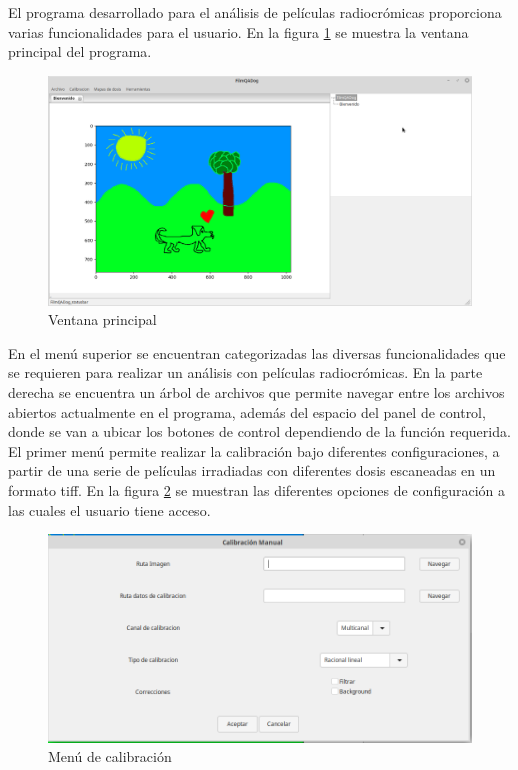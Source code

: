 El programa desarrollado para el análisis de películas radiocrómicas proporciona varias funcionalidades para el usuario. En la figura \ref{fig:ventanaPrincipal} se muestra la ventana principal del programa.\\
\begin{figure}[H]
	\centering
	\includegraphics[width=0.7\linewidth]{images/imagenesDocumentacion/ventanaPrincipal.png}
	\caption{Ventana principal }
	\label{fig:ventanaPrincipal}
\end{figure}

En el menú superior se encuentran categorizadas las diversas funcionalidades que se requieren para realizar un análisis con películas radiocrómicas. En la parte derecha se encuentra un árbol de archivos que permite navegar entre los archivos abiertos actualmente en el programa, además del espacio del panel de control, donde se van a ubicar los botones de control dependiendo de la función requerida.\\

El primer menú permite realizar la calibración bajo diferentes configuraciones, a partir de una serie de películas irradiadas con diferentes dosis escaneadas en un formato tiff. En la figura \ref{fig:menuCalibracion} se muestran las diferentes opciones de configuración a las cuales el usuario tiene acceso.\\
\begin{figure}[H]
	\centering
	\includegraphics[width=0.7\linewidth]{images/imagenesDocumentacion/menuCalibracion.png}
	\caption{Menú de calibración }
	\label{fig:menuCalibracion}
\end{figure}

